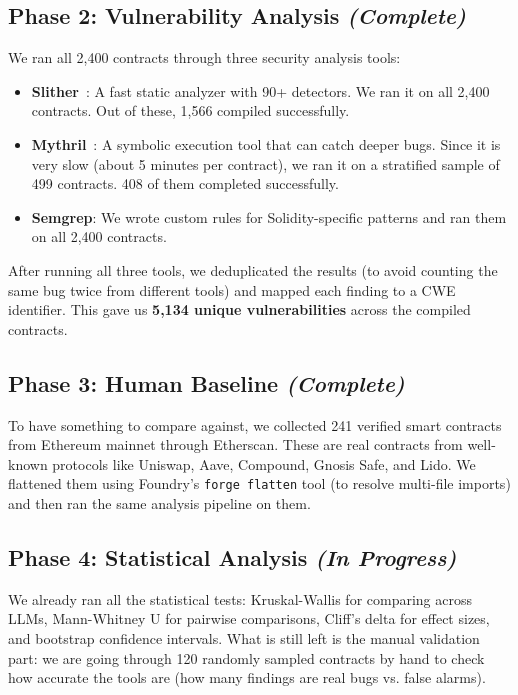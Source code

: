 \documentclass[11pt]{article}
\begin{document}
\subsection{Phase 2: Vulnerability Analysis {\normalfont\textit{(Complete)}}}

We ran all 2,400 contracts through three security analysis tools:
\begin{itemize}[leftmargin=*]
    \item \textbf{Slither}~\cite{slither}: A fast static analyzer with 90+ detectors. We ran it on all 2,400 contracts. Out of these, 1,566 compiled successfully.
    \item \textbf{Mythril}~\cite{mythril}: A symbolic execution tool that can catch deeper bugs. Since it is very slow (about 5 minutes per contract), we ran it on a stratified sample of 499 contracts. 408 of them completed successfully.
    \item \textbf{Semgrep}: We wrote custom rules for Solidity-specific patterns and ran them on all 2,400 contracts.
\end{itemize}

After running all three tools, we deduplicated the results (to avoid counting the same bug twice from different tools) and mapped each finding to a CWE identifier. This gave us \textbf{5,134 unique vulnerabilities} across the compiled contracts.

\subsection{Phase 3: Human Baseline {\normalfont\textit{(Complete)}}}

To have something to compare against, we collected 241 verified smart contracts from Ethereum mainnet through Etherscan. These are real contracts from well-known protocols like Uniswap, Aave, Compound, Gnosis Safe, and Lido. We flattened them using Foundry's \texttt{forge flatten} tool (to resolve multi-file imports) and then ran the same analysis pipeline on them.

\subsection{Phase 4: Statistical Analysis {\normalfont\textit{(In Progress)}}}

We already ran all the statistical tests: Kruskal-Wallis for comparing across LLMs, Mann-Whitney U for pairwise comparisons, Cliff's delta for effect sizes, and bootstrap confidence intervals. What is still left is the manual validation part: we are going through 120 randomly sampled contracts by hand to check how accurate the tools are (how many findings are real bugs vs. false alarms).
\end{document}
